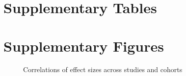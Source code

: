 \documentclass[11pt,letterpaper]{article}
\begin{document}
\FloatBarrier
\newpage
\section*{Supplementary Tables}



\FloatBarrier
\newpage
\section*{Supplementary Figures}

\begin{figure}[ht]
  \caption{Correlations of effect sizes across studies and cohorts}
  \label{fig:corrs}
\end{figure}
\end{document}
